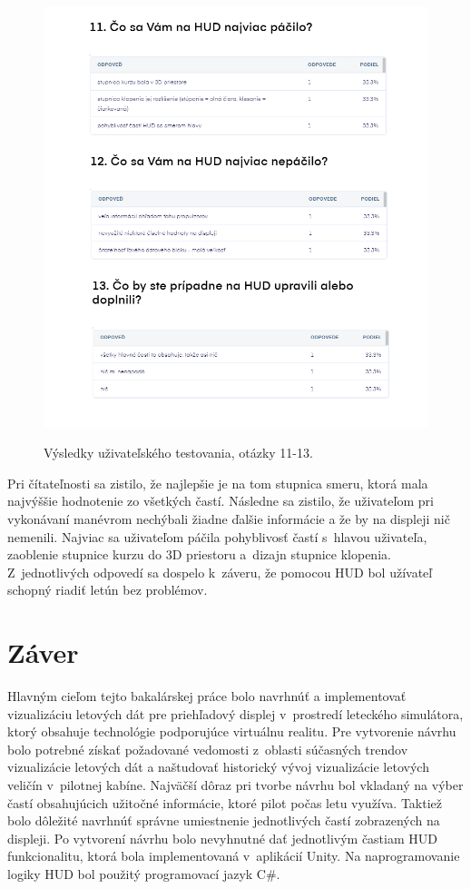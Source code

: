 \begin{figure}[ht]
\centering
\includegraphics[scale=0.65]{obrazky-figures/dotaznik2.1n.png}
\caption{Výsledky uživateľského testovania, otázky 11-13.}{\label{dotaznik3.1}}
\end{figure}

Pri čítateľnosti sa zistilo, že najlepšie je na tom stupnica smeru, ktorá mala najvýššie hodnotenie zo všetkých častí. Následne sa zistilo, že uživateľom pri vykonávaní manévrom nechýbali žiadne ďalšie informácie a že by na displeji nič nemenili. Najviac sa uživateľom páčila pohyblivosť častí s~hlavou uživateľa, zaoblenie stupnice kurzu do 3D priestoru a~dizajn stupnice klopenia. Z~jednotlivých odpovedí sa dospelo k~záveru, že pomocou HUD bol užívateľ schopný riadiť letún bez problémov.

\chapter{Záver}
Hlavným cieľom tejto bakalárskej práce bolo navrhnúť a implementovať vizualizáciu letových dát pre priehľadový displej v~prostredí leteckého simulátora, ktorý obsahuje technológie podporujúce virtuálnu realitu. Pre vytvorenie návrhu bolo potrebné získať požadované vedomosti z~oblasti súčasných trendov vizualizácie letových dát a naštudovať historický vývoj vizualizácie letových veličín v~pilotnej kabíne. Najväčší dôraz pri tvorbe návrhu bol vkladaný na výber častí obsahujúcich užitočné informácie, ktoré pilot počas letu využíva. Taktiež bolo dôležité navrhnúť správne umiestnenie jednotlivých častí zobrazených na displeji. Po vytvorení návrhu bolo nevyhnutné dať jednotlivým častiam HUD funkcionalitu, ktorá bola implementovaná v~aplikácií Unity. Na naprogramovanie logiky HUD bol použitý programovací jazyk C\#. 

